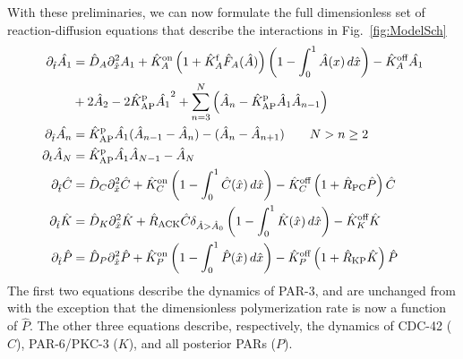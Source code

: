 \documentclass[11pt]{article}
\newcommand{\6}[1]{#1_{\text{6}}}
\newcommand{\3}[1]{#1_{\text{3}}}
\begin{document}
With these preliminaries, we can now formulate the full dimensionless set of reaction-diffusion equations that describe the  interactions in Fig.\ \ref{fig:ModelSch}
\begin{subequations}
\label{eq:AllBC}
\begin{align}
\partial_{\hat{t}} \hat{A_1} & = \hat{D}_A \partial_{\hat{x}}^2 A_1 +\hat{K}^\text{on}_A \left(1+\hat{K}^\text{f}_A \hat F_A(\hat A) \right)\left(1 - \int_0^1 \hat A(x) \, d\hat{x} \right)- \hat{K}^\text{off}_A \hat{A_1} \\ 
 &+ 2 \hat{A}_2-2\hat{K}^\text{p}_\text{AP} \hat{A_1}^2+\sum_{n=3}^N \left(\hat A_n-\hat{K}^\text{p}_\text{AP} \hat A_1 \hat A_{n-1}\right)  \\
\partial_{\hat{t}} \hat{A_n} & =\hat{K}^\text{p}_\text{AP} \hat{A_1} (\hat A_{n-1}-\hat A_n) - (\hat A_n-\hat A_{n+1})  \qquad N > n \geq 2 \\ 
\partial_t \hat A_N & =\hat{K}^\text{p}_\text{AP} \hat {A_1} \hat A_{N-1}- \hat A_N \\ 
\label{eq:Ceqn}
\partial_{\hat{t}} \hat{C}& =\hat{D}_C \partial_{\hat{x}}^2 \hat{C} +\hat{K}^\text{on}_C \left(1 - \int_0^1 \hat{C}(\hat x) \, d\hat{x} \right)  - \hat{K}^\text{off}_C \left(1+\hat{R}_\text{PC}\hat P\right)\hat{C}\\
\label{eq:Keqn}
\partial_{\hat{t}} \hat{K}  &= \hat{D}_K \partial_{\hat{x}}^2 \hat{K} + \hat{R}_\text{ACK} \hat{C} \delta_{\hat A > \hat A_0} \left(1 - \int_0^1 \hat{K}(\hat x) \, d\hat{x} \right)-\hat{K}^\text{off}_K \hat{K} \\
\partial_{\hat{t}} \hat{P} & =\hat{D}_P \partial_{\hat{x}}^2 \hat{P} +\hat{K}^\text{on}_P \left(1 - \int_0^1 \hat{P}(\hat x) \, d\hat{x} \right)  - \hat{K}^\text{off}_P \left(1+\hat{R}_\text{KP}\hat{K}\right)\hat{P}
\end{align}
\end{subequations}
The first two equations describe the dynamics of PAR-3, and are unchanged from \cite{lang2023oligomerization} with the exception that the dimensionless polymerization rate is now a function of $\hat P$. The other three equations describe, respectively, the dynamics of CDC-42 ($C$), PAR-6/PKC-3 ($K$), and all posterior PARs ($P$). 
\end{document}
